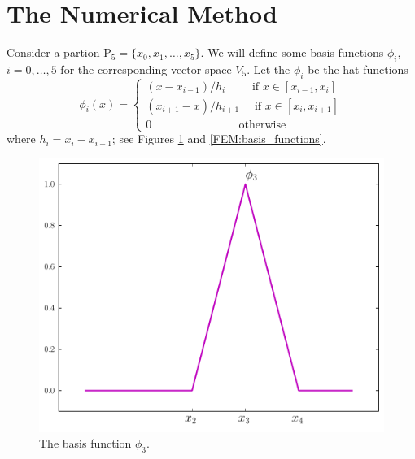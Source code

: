 \section*{The Numerical Method}
Consider a partion $\mathrm{P}_5 = \{x_0, x_1, \ldots, x_5\}$. We will define some basis functions $\phi_i$, $i = 0, \ldots, 5$ for the corresponding vector space $V_5$. Let the $\phi_i$ be the hat functions 
\[
\phi_i(x) = \begin{cases}
(x - x_{i-1})/h_i \quad \quad\text{ if } x \in [x_{i-1},x_i]\\
 (x_{i+1} - x)/h_{i+1} \quad \text{ if } x \in [x_{i},x_{i+1}]\\
0 \quad \quad \quad \quad \quad \quad \quad \,\,\text{ otherwise}
\end{cases}
\]
where $h_i = x_i - x_{i-1}$; see Figures \ref{FEM:one_basis_function} and \ref{FEM:basis_functions}. 


\begin{figure}[ht]
\centering
\includegraphics[width=\textwidth]{one_basis_function.pdf}
\caption{The basis function $\phi_3$.}
\label{FEM:one_basis_function}
\end{figure}


